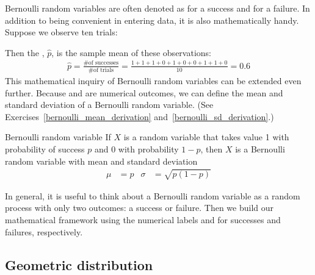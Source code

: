 Bernoulli random variables are often denoted as 
for a success and  for a failure.
In addition to being convenient in entering data,
it is also mathematically handy.
Suppose we observe ten trials:
\begin{center}
         
\end{center}
Then the , $\hat{p}$, is the
sample mean of these observations:
\begin{align*}
\hat{p} = \frac{\text{\# of successes}}{\text{\# of trials}}
    = \frac{1+1+1+0+1+0+0+1+1+0}{10} = 0.6
\end{align*}%
This mathematical inquiry of Bernoulli random variables can
be extended even further.
Because  and  are numerical outcomes,
we can define the {mean} and {standard deviation}
of a Bernoulli random variable.
(See Exercises~\ref{bernoulli_mean_derivation}
and~\ref{bernoulli_sd_derivation}.)

\begin{onebox}{Bernoulli random variable}
  If $X$ is a random variable that takes value 1 with
  probability of success $p$ and 0 with probability $1-p$,
  then $X$ is a Bernoulli random variable with mean
  and standard deviation
  \begin{align*}
  \mu &= p
      &\sigma&= \sqrt{p(1-p)}
  \end{align*}
\end{onebox}

In general, it is useful to think about a Bernoulli random variable as a random process with only two outcomes: a success or failure. Then we build our mathematical framework using the numerical labels  and  for successes and failures, respectively.



\D{\newpage}

\subsection{Geometric distribution}


